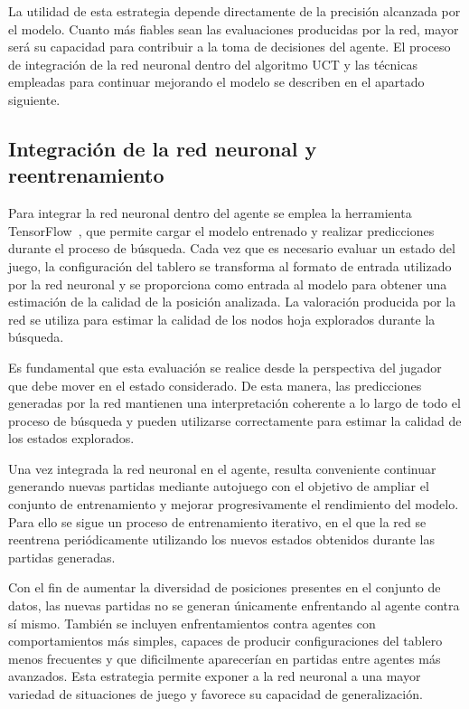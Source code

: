 \documentclass[conference,a4paper]{IEEEtran}
\begin{document}
La utilidad de esta estrategia depende directamente de la precisión alcanzada por el modelo. 
Cuanto más fiables sean las evaluaciones producidas por la red, mayor será su capacidad para contribuir a la toma de decisiones del agente. 
El proceso de integración de la red neuronal dentro del algoritmo UCT y las técnicas empleadas para continuar mejorando el modelo se describen en el apartado siguiente. 

\subsection{Integración de la red neuronal y reentrenamiento} 
Para integrar la red neuronal dentro del agente se emplea la herramienta TensorFlow~\cite{b15}, que permite cargar el modelo entrenado y realizar predicciones durante el proceso de búsqueda. 
Cada vez que es necesario evaluar un estado del juego, la configuración del tablero se transforma al formato de entrada utilizado por la red neuronal y se proporciona como entrada al modelo para obtener una estimación de la calidad de la posición analizada. 
La valoración producida por la red se utiliza para estimar la calidad de los nodos hoja explorados durante la búsqueda. 

Es fundamental que esta evaluación se realice desde la perspectiva del jugador que debe mover en el estado considerado. 
De esta manera, las predicciones generadas por la red mantienen una interpretación coherente a lo largo de todo el proceso de búsqueda y pueden utilizarse correctamente para estimar la calidad de los estados explorados. 

Una vez integrada la red neuronal en el agente, resulta conveniente continuar generando nuevas partidas mediante autojuego con el objetivo de ampliar el conjunto de entrenamiento y mejorar progresivamente el rendimiento del modelo. 
Para ello se sigue un proceso de entrenamiento iterativo, en el que la red se reentrena periódicamente utilizando los nuevos estados obtenidos durante las partidas generadas. 

Con el fin de aumentar la diversidad de posiciones presentes en el conjunto de datos, las nuevas partidas no se generan únicamente enfrentando al agente contra sí mismo. 
También se incluyen enfrentamientos contra agentes con comportamientos más simples, capaces de producir configuraciones del tablero menos frecuentes y que dificilmente aparecerían en partidas entre agentes más avanzados. 
Esta estrategia permite exponer a la red neuronal a una mayor variedad de situaciones de juego y favorece su capacidad de generalización. 
\end{document}
